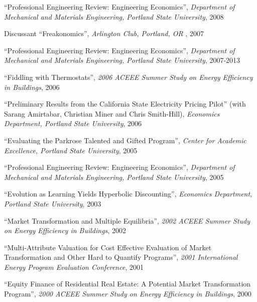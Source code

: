 \documentclass[Computer Science]{vita}
\begin{document}
\begin{vita}
\begin{Presentations and Invited Talks}
  \item ``Professional Engineering Review: Engineering Economics'',
    \emph{Department of Mechanical and Materials Engineering, Portland
      State University}, 2008
  
  \item Discussant ``Freakonomics'', \emph{Arlington Club, Portland,
      OR }, 2007

  \item ``Professional Engineering Review: Engineering Economics'',
    \emph{Department of Mechanical and Materials Engineering, Portland
      State University}, 2007-2013

  \item ``Fiddling with Thermostats'', \emph{2006 ACEEE Summer Study
      on Energy Efficiency in Buildings}, 2006

  \item ``Preliminary Results from the California State Electricity
    Pricing Pilot'' (with Sarang Amirtabar, Christian Miner and Chris
    Smith-Hill), \emph{Economics Department, Portland State
      University}, 2006

  \item ``Evaluating the Parkrose Talented and Gifted Program'',
    \emph{Center for Academic Excellence, Portland State University},
    2005

  \item ``Professional Engineering Review: Engineering Economics'',
    \emph{Department of Mechanical and Materials Engineering, Portland
      State University}, 2005
	
  \item ``Evolution as Learning Yields Hyperbolic Discounting'',
    \emph{Economics Department, Portland State University}, 2003

  \item ``Market Transformation and Multiple Equilibria'', \emph{2002
      ACEEE Summer Study on Energy Efficiency in Buildings}, 2002
	
  \item ``Multi-Attribute Valuation for Cost Effective Evaluation of
    Market Transformation and Other Hard to Quantify Programs'',
    \emph{2001 International Energy Program Evaluation Conference},
    2001
	
  \item ``Equity Finance of Residential Real Estate: A Potential
    Market Transformation Program'', \emph{2000 ACEEE Summer Study on
      Energy Efficiency in Buildings}, 2000


\end{Presentations and Invited Talks}
\end{vita}
\end{document}
